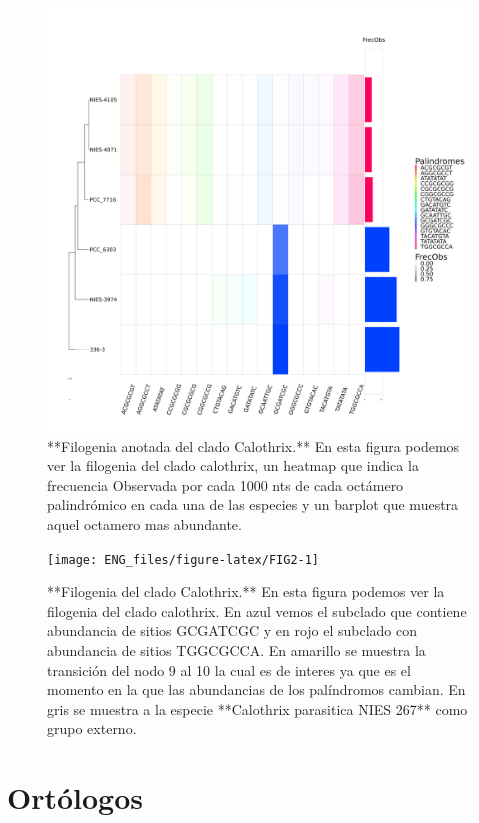 \documentclass[
]{book}
\begin{document}
\begin{figure}

{\centering \includegraphics[width=0.8\linewidth]{Clados/Callothrix_clade/figures/Calothrix_Octanuc_FrecObs_sel32_filogenia_HIG} 

}

\caption{**Filogenia anotada del clado Calothrix.** En esta figura podemos ver la filogenia del clado calothrix, un heatmap que indica la frecuencia Observada por cada 1000 nts de cada octámero palindrómico en cada una de las especies y un barplot que muestra aquel octamero mas abundante.}\label{fig:FIG1}
\end{figure}

\begin{figure}

{\centering \texttt{[image: ENG\_files/figure-latex/FIG2-1]} 

}

\caption{**Filogenia del clado Calothrix.** En esta figura podemos ver la filogenia del clado calothrix. En azul vemos el subclado que contiene abundancia de sitios GCGATCGC y en rojo el subclado con abundancia de sitios TGGCGCCA. En amarillo se muestra la transición del nodo 9 al 10 la cual es de interes ya que es el momento en la que las abundancias de los palíndromos cambian. En gris se muestra a la especie **Calothrix parasitica NIES 267** como grupo externo.}\label{fig:FIG2}
\end{figure}

\hypertarget{ortuxf3logos-1}{%
\section{Ortólogos}\label{ortuxf3logos-1}}
\end{document}
